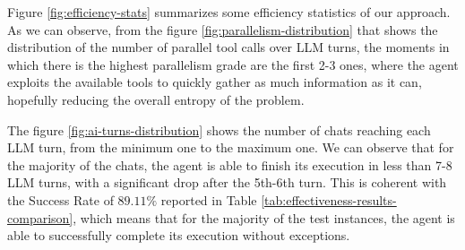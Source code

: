 Figure \ref{fig:efficiency-stats} summarizes some efficiency statistics of our approach. As we can observe, from the figure \ref{fig:parallelism-distribution} that shows the distribution of the number of parallel tool calls over LLM turns, the moments in which there is the highest parallelism grade are the first 2-3 ones, where the agent exploits the available tools to quickly gather as much information as it can, hopefully reducing the overall entropy of the problem. 

The figure \ref{fig:ai-turns-distribution} shows the number of chats reaching each LLM turn, from the minimum one to the maximum one. We can observe that for the majority of the chats, the agent is able to finish its execution in less than 7-8 LLM turns, with a significant drop after the 5th-6th turn. This is coherent with the Success Rate of $89.11\%$ reported in Table \ref{tab:effectiveness-results-comparison}, which means that for the majority of the test instances, the agent is able to successfully complete its execution without exceptions.

